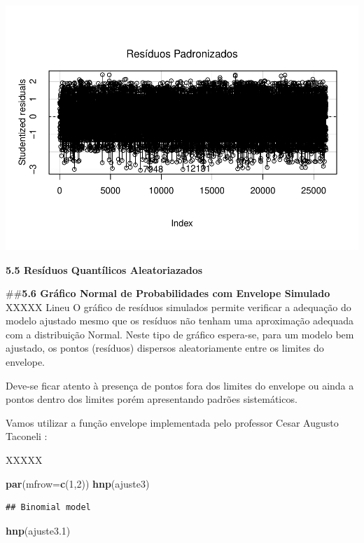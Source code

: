 \documentclass[]{article}
\newenvironment{Shaded}{\begin{snugshade}}{\end{snugshade}}
\newcommand{\KeywordTok}[1]{\textcolor[rgb]{0.13,0.29,0.53}{\textbf{#1}}}
\newcommand{\DataTypeTok}[1]{\textcolor[rgb]{0.13,0.29,0.53}{#1}}
\newcommand{\DecValTok}[1]{\textcolor[rgb]{0.00,0.00,0.81}{#1}}
\newcommand{\FloatTok}[1]{\textcolor[rgb]{0.00,0.00,0.81}{#1}}
\newcommand{\NormalTok}[1]{#1}
\begin{document}
\includegraphics{Dados_Binários1_files/figure-latex/unnamed-chunk-18-1.pdf}

\textbf{5.5 Resíduos Quantílicos Aleatoriazados}

\#\#\textbf{5.6 Gráfico Normal de Probabilidades com Envelope Simulado}
XXXXX Lineu O gráfico de resíduos simulados permite verificar a
adequação do modelo ajustado mesmo que os resíduos não tenham uma
aproximação adequada com a distribuição Normal. Neste tipo de gráfico
espera-se, para um modelo bem ajustado, os pontos (resíduos) dispersos
aleatoriamente entre os limites do envelope.

Deve-se ficar atento à presença de pontos fora dos limites do envelope
ou ainda a pontos dentro dos limites porém apresentando padrões
sistemáticos.

Vamos utilizar a função envelope implementada pelo professor Cesar
Augusto Taconeli :

XXXXX

\begin{Shaded}
\begin{Highlighting}[]
\KeywordTok{par}\NormalTok{(}\DataTypeTok{mfrow=}\KeywordTok{c}\NormalTok{(}\DecValTok{1}\NormalTok{,}\DecValTok{2}\NormalTok{))}
\KeywordTok{hnp}\NormalTok{(ajuste3)}
\end{Highlighting}
\end{Shaded}

\begin{verbatim}
## Binomial model
\end{verbatim}

\begin{Shaded}
\begin{Highlighting}[]
\KeywordTok{hnp}\NormalTok{(ajuste3}\FloatTok{.1}\NormalTok{)}
\end{Highlighting}
\end{Shaded}
\end{document}

